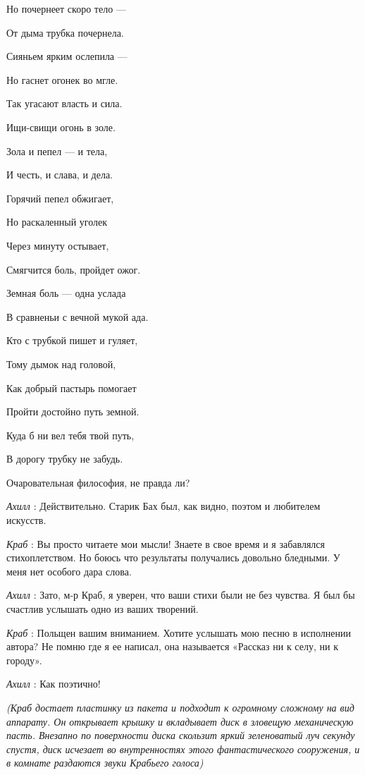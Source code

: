 Но почернеет скоро тело ---

От дыма трубка почернела.

Сияньем ярким ослепила ---

Но гаснет огонек во мгле.

Так угасают власть и сила.

Ищи-свищи огонь в золе.

Зола и пепел --- и тела,

И честь, и слава, и дела.

Горячий пепел обжигает,

Но раскаленный уголек

Через минуту остывает,

Смягчится боль, пройдет ожог.

Земная боль --- одна услада

В сравненьи с вечной мукой ада.

Кто с трубкой пишет и гуляет,

Тому дымок над головой,

Как добрый пастырь помогает

Пройти достойно путь земной.

Куда б ни вел тебя твой путь,

В дорогу трубку не забудь.

Очаровательная философия, не правда ли?

\emph{Ахилл} : Действительно. Старик Бах был, как видно, поэтом и любителем искусств.

\emph{Краб} : Вы просто читаете мои мысли! Знаете в свое время и я забавлялся стихоплетством. Но боюсь что результаты получались довольно бледными. У меня нет особого дара слова.

\emph{Ахилл} : Зато, м-р Краб, я уверен, что ваши стихи были не без чувства. Я был бы счастлив услышать одно из ваших творений.

\emph{Краб} : Польщен вашим вниманием. Хотите услышать мою песню в исполнении автора? Не помню где я ее написал, она называется «Рассказ ни к селу, ни к городу».

\emph{Ахилл} : Как поэтично!

\emph{(Краб достает пластинку из пакета и подходит к огромному сложному на вид аппарату. Он открывает крышку и вкладывает диск в зловещую механическую пасть. Внезапно по поверхности диска скользит яркий зеленоватый луч секунду спустя, диск исчезает во внутренностях этого фантастического сооружения, и в комнате раздаются звуки Крабьего голоса)}

